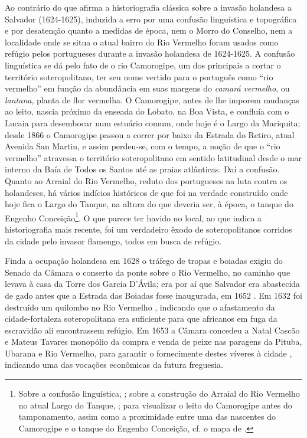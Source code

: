 Ao contrário do que afirma a historiografia clássica sobre a invasão holandesa a Salvador (1624-1625), induzida a erro por uma confusão linguística e topográfica e por desatenção quanto a medidas de época, nem o Morro do Conselho, nem a localidade onde se situa o atual bairro do Rio Vermelho foram usados como refúgio pelos portugueses durante a invasão holandesa de 1624-1625. A confusão linguística se dá pelo fato de o rio Camorogipe, um dos principais a cortar o território soteropolitano, ter seu nome vertido para o português como ``rio vermelho'' em função da abundância em suas margens do \textit{camará vermelho}, ou \textit{lantana}, planta de flor vermelha. O Camorogipe, antes de lhe imporem mudanças ao leito, nascia próximo da enseada do Lobato, na Boa Vista, e confluía com o Lucaia para desembocar num estuário comum, onde hoje é o Largo da Mariquita; desde 1866 o Camorogipe passou a correr por baixo da Estrada do Retiro, atual Avenida San Martin, e assim perdeu-se, com o tempo, a noção de que o ``rio vermelho'' atravessa o território soteropolitano em sentido latitudinal desde o mar interno da Baía de Todos os Santos até as praias atlânticas. Daí a confusão. Quanto ao Arraial do Rio Vermelho, reduto dos portugueses na luta contra os holandeses, há vários indícios históricos de que foi na verdade construído onde hoje fica o Largo do Tanque, na altura do que deveria ser, à época, o tanque do Engenho Conceição\footnote{Sobre a confusão linguística, ; sobre a construção do Arraial do Rio Vermelho no atual Largo do Tanque, ; para visualizar o leito do Camorogipe antes do tamponamento, assim como a proximidade entre uma das nascentes do Camorogipe e o tanque do Engenho Conceição, cf. o mapa de .}. O que parece ter havido no local, ao que indica a historiografia mais recente, foi um verdadeiro êxodo de soteropolitanos corridos da cidade pelo invasor flamengo, todos em busca de refúgio.

Finda a ocupação holandesa em 1628 o tráfego de tropas e boiadas exigiu do Senado da Câmara o conserto da ponte sobre o Rio Vermelho, no caminho que levava à casa da Torre dos Garcia D'Ávila; era por aí que Salvador era abastecida de gado antes que a Estrada das Boiadas fosse inaugurada, em 1652 \cite[pp.~315-316]{azevedo_povoamento_1969}. Em 1632 foi destruído um quilombo no Rio Vermelho \cite[p.~67]{VASCONCELOS2002}, indicando que o afastamento da cidade-fortaleza soteropolitana era suficiente para que africanos em fuga da escravidão ali encontrassem refúgio. Em 1653 a Câmara concedeu a Natal Cascão e Mateus Tavares monopólio da compra e venda de peixe nas paragens da Pituba, Ubarana e Rio Vermelho, para garantir o fornecimente destes víveres à cidade \cite[p.~259]{azevedo_povoamento_1969}, indicando uma das vocações econômicas da futura freguesia.

